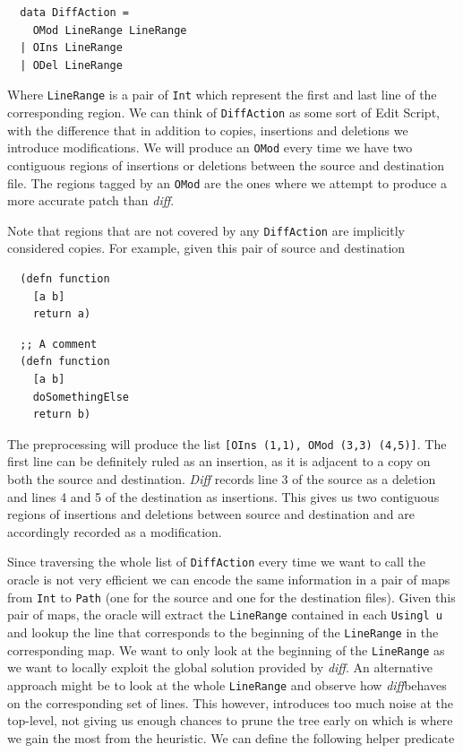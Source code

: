 \documentclass[11pt, titlepage]{article}
\newcommand{\toHaskell}[1]{\texttt{#1}\xspace}
\newcommand{\diff}{\emph{diff}}
\begin{document}
\begin{verbatim}
  data DiffAction = 
    OMod LineRange LineRange
  | OIns LineRange
  | ODel LineRange  
\end{verbatim}

Where \toHaskell{LineRange} is a pair of \toHaskell{Int} which represent the first and last line of the corresponding region.
We can think of \toHaskell{DiffAction} as some sort of Edit Script, with the difference that in addition to copies, insertions and deletions we introduce modifications.
We will produce an \toHaskell{OMod} every time we have two contiguous regions of insertions or deletions between the source and destination file. The regions tagged by an \toHaskell{OMod} are the ones where we attempt to produce a more accurate patch than \diff. 

Note that regions that are not covered by any \toHaskell{DiffAction} are implicitly considered copies.
For example, given this pair of source and destination

\vspace{.6em}
\begin{minipage}[t]{0.4\textwidth}
\begin{verbatim}
  (defn function
    [a b]
    return a)
\end{verbatim}
\end{minipage}
\begin{minipage}[t]{0.4\textwidth}
\begin{verbatim}
  ;; A comment
  (defn function
    [a b]
    doSomethingElse
    return b)
\end{verbatim}
\end{minipage}
\vspace{.6em}

The preprocessing will produce the list \toHaskell{[OIns (1,1), OMod (3,3) (4,5)]}. The first line can be definitely ruled as an insertion, as it is adjacent to a copy on both the source and destination. \emph{Diff} records line 3 of the source as a deletion and lines 4 and 5 of the destination as insertions. This gives us two contiguous regions of insertions and deletions between source and destination and are accordingly recorded as a modification. 

Since traversing the whole list of \toHaskell{DiffAction} every time we want to call the oracle is not very efficient we can encode the same information in a pair of maps from \toHaskell{Int} to \toHaskell{Path} (one for the source and one for the destination files). 
Given this pair of maps, the oracle will extract the \toHaskell{LineRange} contained in each \toHaskell{Usingl u} and lookup the line that corresponds to the beginning of the \toHaskell{LineRange} in the corresponding map. We want to only look at the beginning of the \toHaskell{LineRange} as we want to locally exploit the global solution provided by \diff. An alternative approach might be to look at the whole \toHaskell{LineRange} and observe how \diff behaves on the corresponding set of lines. This however, introduces too much noise at the top-level, not giving us enough chances to prune the tree early on which is where we gain the most from the heuristic.
We can define the following helper predicate
\end{document}
